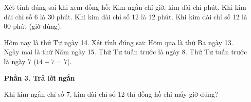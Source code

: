 \begin{ex} %
Xét tính đúng sai khi xem đồng hồ:
\choiceTF
{\True Kim ngắn chỉ giờ, kim dài chỉ phút.}
{\True Khi kim dài chỉ số 6 là 30 phút.}
{Khi kim dài chỉ số 12 là 12 phút.}
{\True Khi kim dài chỉ số 12 là 00 phút (giờ đúng).}
\end{ex}

\begin{ex} %
Hôm nay là thứ Tư ngày 14. Xét tính đúng sai:
\choiceTF
{\True Hôm qua là thứ Ba ngày 13.}
{\True Ngày mai là thứ Năm ngày 15.}
{Thứ Tư tuần trước là ngày 8.}
{\True Thứ Tư tuần trước là ngày 7 ($14 - 7 = 7$).}
\end{ex}

\textbf{Phần 3. Trả lời ngắn}

\begin{ex} %
Khi kim ngắn chỉ số 7, kim dài chỉ số 12 thì đồng hồ chỉ mấy giờ đúng?
\end{ex}

